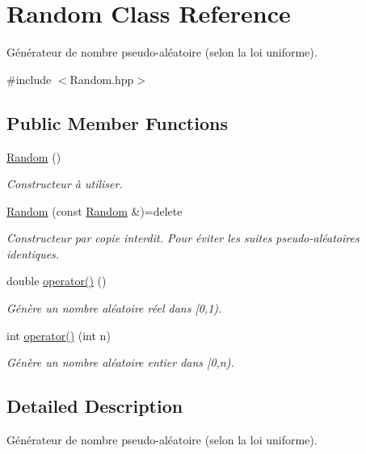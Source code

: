 \hypertarget{classRandom}{\section{Random Class Reference}
\label{classRandom}
}


Générateur de nombre pseudo-\/aléatoire (selon la loi uniforme).  




{\ttfamily \#include $<$Random.\+hpp$>$}

\subsection*{Public Member Functions}
\begin{DoxyCompactItemize}
\item 
\hyperlink{classRandom_acb76b49c3903a3c4fb67fd216341f08d}{Random} ()
\begin{DoxyCompactList}\small\item\em Constructeur à utiliser. \end{DoxyCompactList}\item 
\hyperlink{classRandom_a9bfadeaa4adc5ac44142d000b1c99441}{Random} (const \hyperlink{classRandom}{Random} \&)=delete
\begin{DoxyCompactList}\small\item\em Constructeur par copie interdit. Pour éviter les suites pseudo-\/aléatoires identiques. \end{DoxyCompactList}\item 
double \hyperlink{classRandom_aa0277ecffaf7d920b8ebd2399214f113}{operator()} ()
\begin{DoxyCompactList}\small\item\em Génère un nombre aléatoire réel dans \mbox{[}0,1). \end{DoxyCompactList}\item 
int \hyperlink{classRandom_a20265a86364664d85253931dc4685fa3}{operator()} (int n)
\begin{DoxyCompactList}\small\item\em Génère un nombre aléatoire entier dans \mbox{[}0,n). \end{DoxyCompactList}\end{DoxyCompactItemize}


\subsection{Detailed Description}
Générateur de nombre pseudo-\/aléatoire (selon la loi uniforme). 

